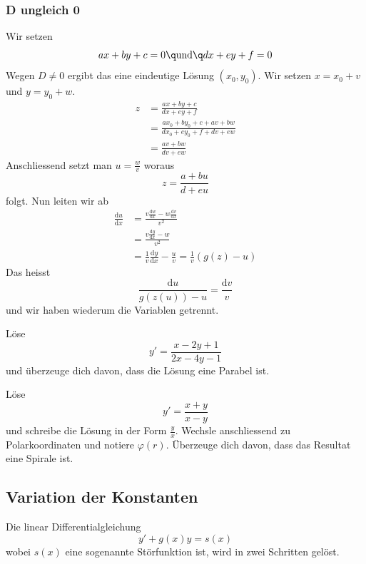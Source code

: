 \documentclass[%
draft,
11pt,%
twoside,%
titlepage,%
german,%
headsepline%
]{scrartcl}
\begin{document}
 \subsubsection{D ungleich 0}
 
 Wir setzen
 $$ax+by+c=0\q\text{und}\q dx+ey+f=0$$
 Wegen $D\neq0$ ergibt das eine eindeutige L\"osung $(x_0,y_0)$. Wir setzen $x=x_0+v$ und $y=y_0+w$.
 \begin{align*}
z &= \frac{ax+by+c}{dx+ey+f}\\
&=\frac{ax_0+by_0+c+av+bw}{dx_0+ey_0+f+dv+ew}\\
&=\frac{av+bw}{dv+ew}
\end{align*}
Anschliessend setzt man $u=\frac{w}{v}$ woraus
$$z=\frac{a+bu}{d+eu}$$
folgt. Nun leiten wir ab
\begin{align*}
\frac{\mathrm{d}u}{\mathrm{d}x}&=\frac{v\frac{\mathrm{d}w}{\mathrm{d}x}-w\frac{\mathrm{d}v}{\mathrm{d}x}}{v^2}\\
&=\frac{v\frac{\mathrm{d}y}{\mathrm{d}x}-w}{v^2}\\
&=\frac{1}{v}\frac{\mathrm{d}y}{\mathrm{d}x}-\frac{u}{v}=\frac{1}{v}(g(z)-u)
\end{align*}
Das heisst
$$\frac{\mathrm{d}u}{g(z(u))-u}=\frac{\mathrm{d}v}{v}$$
und wir haben wiederum die Variablen getrennt.

\begin{ueb}
L\"ose
$$y'=\frac{x-2y+1}{2x-4y-1}$$
und \"uberzeuge dich davon, dass die L\"osung eine Parabel ist.
\end{ueb}

\begin{ueb}
L\"ose
$$y'=\frac{x+y}{x-y}$$
und schreibe die L\"osung in der Form $\frac{y}{x}$. Wechsle anschliessend zu Polarkoordinaten und notiere $\varphi(r)$. \"Uberzeuge dich davon, dass das Resultat eine Spirale ist.
\end{ueb}

\subsection{Variation der Konstanten}

Die linear Differentialgleichung
$$y'+g(x)y=s(x)$$
wobei $s(x)$ eine sogenannte St\"orfunktion ist, wird in zwei Schritten gel\"ost.
\end{document}

